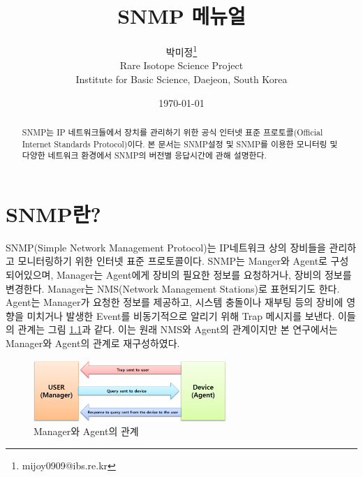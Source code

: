 \documentclass[11pt
  , a4paper
  , article
  , oneside
]{memoir}
\begin{document}
\newcommand{\technumber}{
  RAON Control-Document Series\\
  Revision : v1.0,   Release : Jan. 02. 2015}
\title{\textbf{SNMP 메뉴얼}}

\author{박미정\thanks{mijoy0909@ibs.re.kr} \\

  Rare Isotope Science Project\\
  Institute for Basic Science, Daejeon, South Korea
}
\date{\today}

\renewcommand{\maketitlehooka}{\begin{flushright}\textsf{\technumber}\end{flushright}}

\maketitle

\begin{abstract}
SNMP는 IP 네트워크들에서 장치를 관리하기 위한 공식 인터넷 표준 프로토콜(Official Internet Standards Protocol)\citep{oisp}이다. 본 문서는 SNMP설정 및 SNMP를 이용한 모니터링 및 다양한 네트워크 환경에서 SNMP의 버전별 응답시간에 관해 설명한다. 
\end{abstract}

\chapter{SNMP란?}
SNMP(Simple Network Management Protocol)는 IP네트워크 상의 장비들을 관리하고 모니터링하기 위한 인터넷 표준 프로토콜이다. SNMP는 Manger와 Agent로 구성되어있으며, Manager는 Agent에게 장비의 필요한 정보를 요청하거나, 장비의 정보를 변경한다. Manager는 NMS(Network Management Stations)로 표현되기도 한다. Agent는 Manager가 요청한 정보를 제공하고, 시스템 충돌이나 재부팅 등의 장비에 영향을 미치거나 발생한 Event를 비동기적으로 알리기 위해 Trap 메시지를 보낸다. 이들의 관계는 그림 \ref{fig:relationship_m_a}\citep{essential_snmp}과 같다. 이는 원래 NMS와 Agent의 관계이지만 본 연구에서는 Manager와 Agent의 관계로 재구성하였다.
\begin{figure}[h!]
  \centering
  \includegraphics[width=0.65\textwidth]{./images/relationship_m_a.eps}
  \caption{Manager와 Agent의 관계}
  \label{fig:relationship_m_a}   
\end{figure}
\end{document}
